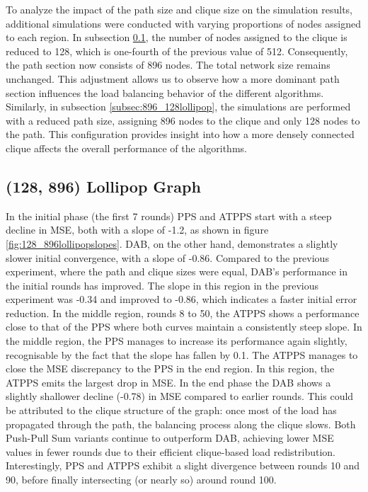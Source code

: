 To analyze the impact of the path size and clique size on the simulation results, additional simulations were conducted with varying proportions of nodes assigned to each region. In subsection \ref{subsec:128_896lollipop}, the number of nodes assigned to the clique is reduced to 128, which is one-fourth of the previous value of 512. Consequently, the path section now consists of 896 nodes. The total network size remains unchanged. This adjustment allows us to observe how a more dominant path section influences the load balancing behavior of the different algorithms. Similarly, in subsection \ref{subsec:896_128lollipop}, the simulations are performed with a reduced path size, assigning 896 nodes to the clique and only 128 nodes to the path. This configuration provides insight into how a more densely connected clique affects the overall performance of the algorithms.

\subsection{(128, 896) Lollipop Graph}\label{subsec:128_896lollipop}
In the initial phase (the first 7 rounds) PPS and ATPPS start with a steep decline in MSE, both with a slope of -1.2, as shown in figure \ref{fig:128_896lollipopslopes}. DAB, on the other hand, demonstrates a slightly slower initial convergence, with a slope of -0.86. Compared to the previous experiment, where the path and clique sizes were equal, DAB's performance in the initial rounds has improved. The slope in this region in the previous experiment was -0.34 and improved to -0.86, which indicates a faster initial error reduction. In the middle region, rounds 8 to 50, the ATPPS shows a performance close to that of the PPS where both curves maintain a consistently steep slope. In the middle region, the PPS manages to increase its performance again slightly, recognisable by the fact that the slope has fallen by 0.1. The ATPPS manages to close the MSE discrepancy to the PPS in the end region. In this region, the ATPPS emits the largest drop in MSE. In the end phase the DAB shows a slightly shallower decline (-0.78) in MSE compared to earlier rounds. This could be attributed to the clique structure of the graph: once most of the load has propagated through the path, the balancing process along the clique slows. Both Push-Pull Sum variants continue to outperform DAB, achieving lower MSE values in fewer rounds due to their efficient clique-based load redistribution. Interestingly, PPS and ATPPS exhibit a slight divergence between rounds 10 and 90, before finally intersecting (or nearly so) around round 100.

